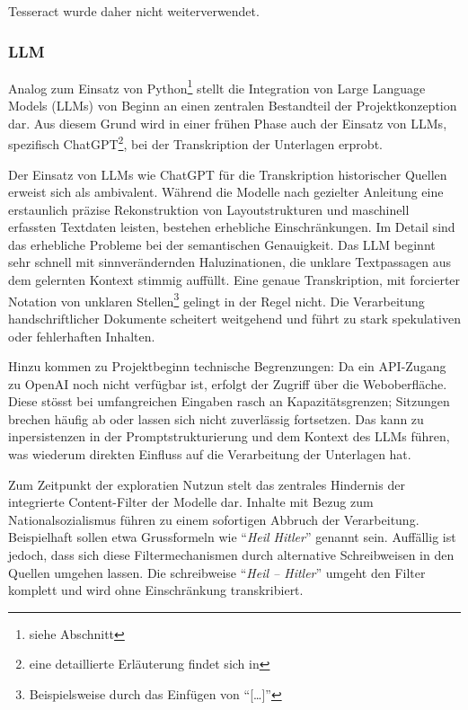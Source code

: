 \documentclass[12pt, a4paper, ngerman, bidi=default]{article}
\begin{document}
Tesseract wurde daher nicht weiterverwendet.

\subsubsection{LLM}\label{subsubsec:LLM_transcript}
Analog zum Einsatz von Python\footnote{siehe Abschnitt } stellt die Integration von Large Language Models (LLMs) von Beginn an einen zentralen Bestandteil der Projektkonzeption dar.
Aus diesem Grund wird in einer frühen Phase auch der Einsatz von LLMs, spezifisch ChatGPT\footnote{eine detaillierte Erläuterung findet sich in }, bei der Transkription der Unterlagen erprobt.

Der Einsatz von LLMs wie ChatGPT für die Transkription historischer Quellen erweist sich als ambivalent. Während die Modelle nach gezielter 
Anleitung eine erstaunlich präzise Rekonstruktion von Layoutstrukturen und maschinell erfassten Textdaten leisten, bestehen erhebliche Einschränkungen. Im Detail sind das
erhebliche Probleme bei der semantischen Genauigkeit. Das LLM beginnt sehr schnell mit sinnverändernden Haluzinationen, die unklare Textpassagen aus dem gelernten Kontext stimmig auffüllt.
Eine genaue Transkription, mit forcierter Notation von unklaren Stellen\footnote{Beispielsweise durch das Einfügen von \enquote{[\dots]}} gelingt in der Regel nicht. 
Die Verarbeitung handschriftlicher Dokumente scheitert weitgehend und führt zu stark spekulativen oder fehlerhaften Inhalten.

Hinzu kommen zu Projektbeginn technische Begrenzungen: Da ein API-Zugang zu OpenAI noch nicht verfügbar ist, erfolgt der Zugriff 
über die Weboberfläche. Diese stösst bei umfangreichen Eingaben rasch an Kapazitätsgrenzen; 
Sitzungen brechen häufig ab oder lassen sich nicht zuverlässig fortsetzen. Das kann zu inpersistenzen in der Promptstrukturierung und
dem Kontext des LLMs führen, was wiederum direkten Einfluss auf die Verarbeitung der Unterlagen hat.

Zum Zeitpunkt der exploratien Nutzun stelt das zentrales Hindernis der integrierte Content-Filter der Modelle dar. Inhalte mit Bezug zum Nationalsozialismus
führen zu einem sofortigen Abbruch der Verarbeitung. Beispielhaft sollen etwa Grussformeln wie \enquote{\textit{Heil Hitler}} genannt sein. Auffällig ist jedoch, dass
sich diese Filtermechanismen durch alternative Schreibweisen in den Quellen umgehen lassen. Die schreibweise \enquote{\textit{Heil -- Hitler}} umgeht den Filter komplett 
und wird ohne Einschränkung transkribiert.
\end{document}
